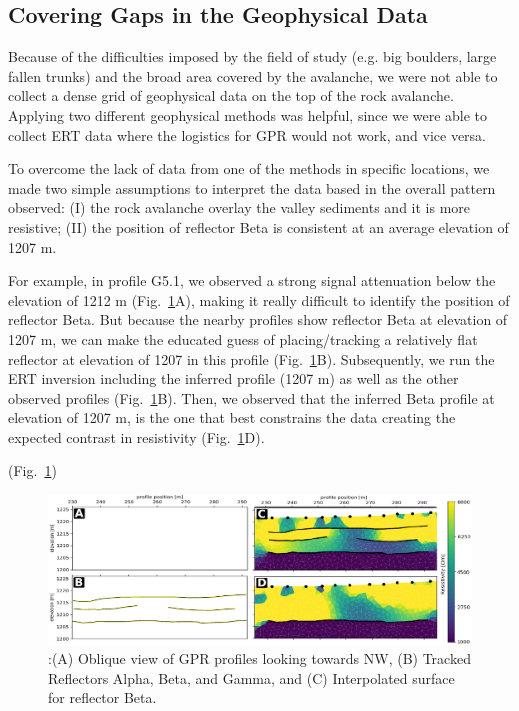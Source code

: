 \documentclass[5p]{elsarticle}
\begin{document}
\subsection{Covering Gaps in the Geophysical Data}

Because of the difficulties imposed by the field of study (e.g. big boulders,  large fallen trunks) and the broad area covered by the avalanche, we were not able to collect a dense grid of geophysical data on the top of the rock avalanche. Applying two different geophysical methods was helpful, since we were able to collect ERT data where the logistics for GPR would not work, and vice versa. 

To overcome the lack of data from one of the methods in specific locations, we made two simple assumptions to interpret the data based in the overall pattern observed: (I) the rock avalanche overlay the valley sediments and it is more resistive; (II) the position of reflector Beta is consistent at an average elevation of 1207 m.  

For example, in profile G5.1, we observed a strong signal attenuation below the elevation of 1212 m (Fig.~\ref{Combined_ABCD}A), making it really difficult to identify the position of reflector Beta. But because the nearby profiles show reflector Beta at elevation of 1207 m, we can make the educated guess of placing/tracking a relatively flat reflector at elevation of 1207 in this profile (Fig.~\ref{Combined_ABCD}B). Subsequently, we run the ERT inversion including the inferred profile (1207 m) as well as the other observed profiles (Fig.~\ref{Combined_ABCD}B). Then, we observed that the inferred Beta profile at elevation of 1207 m, is the one that best constrains the data creating the expected contrast in resistivity (Fig.~\ref{Combined_ABCD}D).  


				(Fig.~\ref{Combined_ABCD})			

                                \begin{figure}[h]

	\includegraphics[width=\textwidth]{Figures/Combined_ABCD.pdf}
		\caption{:(A) Oblique view of GPR profiles looking towards NW, (B) Tracked Reflectors Alpha, Beta, and Gamma, and (C) Interpolated surface for reflector Beta. \label{Combined_ABCD}}

								   \end{figure}
\end{document}
